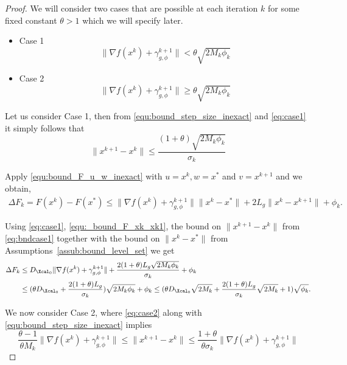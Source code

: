 \documentclass[11pt]{article}
\numberwithin{equation}{section}
\begin{document}
\begin{proof}	                
	We will consider two cases that are possible at each iteration $k$ for some fixed constant $\theta>1$ which we will specify later. 
	\begin{itemize}
	\item{Case 1} 
	\begin{equation}\label{eq:case1}
		\|  \nabla f(x^k) + \gamma_{g, \phi}^{k+1} \| < \theta\sqrt{2M_k\phi_k}
	\end{equation}

	\item{Case 2}
	\begin{equation}\label{eq:case2}
		\| \nabla f(x^k) + \gamma_{g, \phi}^{k+1} \| \geq \theta \sqrt{2M_k\phi_k}
	\end{equation}

	\end{itemize}

	Let us consider Case 1, then from \eqref{equ:bound_step_size_inexact}  and \eqref{eq:case1} it simply follows that
	\begin{equation}\label{eq:bndcase1} 
		\| x^{k+1} - x^k\|\leq \frac{(1+\theta)\sqrt{2M_k\phi_k}}{\sigma_k}
	\end{equation}

	Apply \eqref{equ:bound_F_u_w_inexact} with $u = x^k, w = x^*$ and $v = x^{k+1}$ and we obtain,
	\begin{align}
	\label{equ:_bound_F_xk_xk1}
	    \Delta F_k = F(x^k) - F(x^*)
	    \leq \|\nabla f(x^k)+\gamma_{g, \phi}^{k+1}\|\|x^k-x^*\| + 2L_g \|x^k-x^{k+1}\| + \phi_k. 
	\end{align}

	Using \eqref{eq:case1}, \eqref{equ:_bound_F_xk_xk1}, the bound on  $\| x^{k+1} - x^k\|$ from \eqref{eq:bndcase1} together with the bound on $\|x^{k} - x^*\|$ from Assumptions~\ref{assub:bound_level_set} we get
	\begin{align*}
	    \Delta F_k
	    &\leq D_{\Xcal_0} \|\nabla f(x^k)+\gamma_{g, \phi}^{k+1}\| +  \frac{2(1+\theta)L_g\sqrt{2M_k\phi_k}}{\sigma_k} + \phi_k \\
	    &\leq (\theta D_{\Xcal_0}+  \frac{2(1+\theta)L_g}{\sigma_k})\sqrt{2M_k\phi_k} + \phi_k 
	    \leq (\theta D_{\Xcal_0}\sqrt{2M_k}+  \frac{2(1+\theta)L_g}{\sigma_k}\sqrt{2M_k} + 1) \sqrt{\phi_k}.
	\end{align*}
	  
	We now consider Case 2, where \eqref{eq:case2} along with \eqref{equ:bound_step_size_inexact} implies
	\begin{equation}\label{eq:bndcase2} 
		\frac{\theta-1}{\theta M_k}\| \nabla f(x^k) + \gamma_{g, \phi}^{k+1} \| \leq \| x^{k+1} - x^k\|\leq \frac{1+\theta}{\theta\sigma_k}\| \nabla f(x^k) + \gamma_{g, \phi}^{k+1} \|
	\end{equation}


\end{proof}
\end{document}
